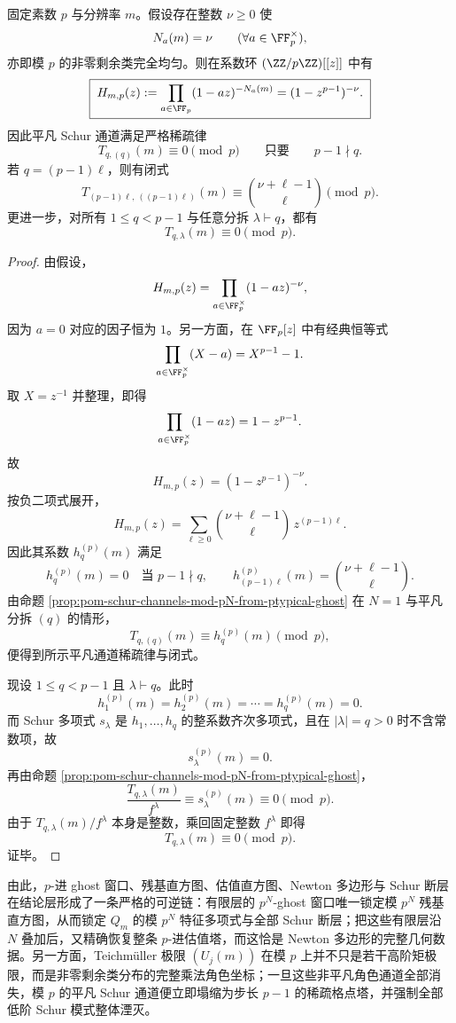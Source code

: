 \begin{corollary}\label{cor:conclusion-modp-uniformity-forces-trivial-schur-sparsity}
固定素数 \(p\) 与分辨率 \(m\)。假设存在整数 \(\nu\ge 0\) 使
\[
N_a(m)=\nu
\qquad(\forall a\in \FF_p^\times),
\]
亦即模 \(p\) 的非零剩余类完全均匀。则在系数环 \((\ZZ/p\ZZ)[[z]]\) 中有
\[
\boxed{\;
H_{m,p}(z):=
\prod_{a\in \FF_p}(1-az)^{-N_a(m)}
=(1-z^{p-1})^{-\nu}.\;}
\]
因此平凡 Schur 通道满足严格稀疏律
\[
\boxed{\;
T_{q,(q)}(m)\equiv 0\pmod p
\qquad\text{只要}\qquad
p-1\nmid q.\;}
\]
若 \(q=(p-1)\ell\)，则有闭式
\[
\boxed{\;
T_{(p-1)\ell,\ ((p-1)\ell)}(m)
\equiv
\binom{\nu+\ell-1}{\ell}\pmod p.\;}
\]
更进一步，对所有 \(1\le q<p-1\) 与任意分拆 \(\lambda\vdash q\)，都有
\[
\boxed{\;
T_{q,\lambda}(m)\equiv 0\pmod p.\;}
\]
\end{corollary}
\begin{proof}
由假设，
\[
H_{m,p}(z)
=
\prod_{a\in\FF_p^\times}(1-az)^{-\nu},
\]
因为 \(a=0\) 对应的因子恒为 \(1\)。另一方面，在 \(\FF_p[z]\) 中有经典恒等式
\[
\prod_{a\in\FF_p^\times}(X-a)=X^{p-1}-1.
\]
取 \(X=z^{-1}\) 并整理，即得
\[
\prod_{a\in\FF_p^\times}(1-az)=1-z^{p-1}.
\]
故
\[
H_{m,p}(z)=(1-z^{p-1})^{-\nu}.
\]
按负二项式展开，
\[
H_{m,p}(z)=\sum_{\ell\ge 0}\binom{\nu+\ell-1}{\ell}\,z^{(p-1)\ell}.
\]
因此其系数 \(h_q^{(p)}(m)\) 满足
\[
h_q^{(p)}(m)=0
\quad\text{当 }p-1\nmid q,
\qquad
h_{(p-1)\ell}^{(p)}(m)=\binom{\nu+\ell-1}{\ell}.
\]
由命题 \ref{prop:pom-schur-channels-mod-pN-from-ptypical-ghost} 在 \(N=1\) 与平凡分拆 \((q)\) 的情形，
\[
T_{q,(q)}(m)\equiv h_q^{(p)}(m)\pmod p,
\]
便得到所示平凡通道稀疏律与闭式。

现设 \(1\le q<p-1\) 且 \(\lambda\vdash q\)。此时
\[
h_1^{(p)}(m)=h_2^{(p)}(m)=\cdots=h_q^{(p)}(m)=0.
\]
而 Schur 多项式 \(s_\lambda\) 是 \(h_1,\dots,h_q\) 的整系数齐次多项式，且在 \(|\lambda|=q>0\) 时不含常数项，故
\[
s_\lambda^{(p)}(m)=0.
\]
再由命题 \ref{prop:pom-schur-channels-mod-pN-from-ptypical-ghost}，
\[
\frac{T_{q,\lambda}(m)}{f^\lambda}\equiv s_\lambda^{(p)}(m)\equiv 0\pmod p.
\]
由于 \(T_{q,\lambda}(m)/f^\lambda\) 本身是整数，乘回固定整数 \(f^\lambda\) 即得
\[
T_{q,\lambda}(m)\equiv 0\pmod p.
\]
证毕。
\end{proof}

\noindent
由此，\(p\)-进 ghost 窗口、残基直方图、估值直方图、Newton 多边形与 Schur 断层在结论层形成了一条严格的可逆链：有限层的 \(p^N\)-ghost 窗口唯一锁定模 \(p^N\) 残基直方图，从而锁定 \(Q_m\) 的模 \(p^N\) 特征多项式与全部 Schur 断层；把这些有限层沿 \(N\) 叠加后，又精确恢复整条 \(p\)-进估值塔，而这恰是 Newton 多边形的完整几何数据。另一方面，Teichm\"uller 极限 \((U_j(m))\) 在模 \(p\) 上并不只是若干高阶矩极限，而是非零剩余类分布的完整乘法角色坐标；一旦这些非平凡角色通道全部消失，模 \(p\) 的平凡 Schur 通道便立即塌缩为步长 \(p-1\) 的稀疏格点塔，并强制全部低阶 Schur 模式整体湮灭。

\endinput
